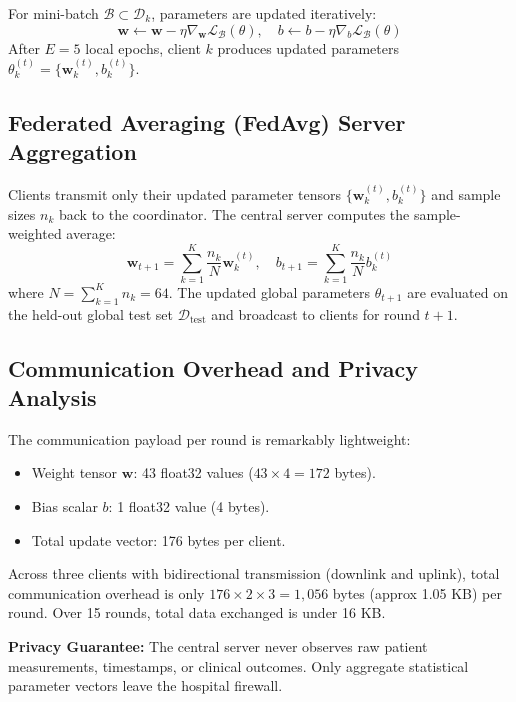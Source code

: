 For mini-batch $\mathcal{B} \subset \mathcal{D}_k$, parameters are updated iteratively:
\begin{equation}
\mathbf{w} \leftarrow \mathbf{w} - \eta \nabla_{\mathbf{w}} \mathcal{L}_{\mathcal{B}}(\theta), \quad b \leftarrow b - \eta \nabla_{b} \mathcal{L}_{\mathcal{B}}(\theta)
\end{equation}
After $E = 5$ local epochs, client $k$ produces updated parameters $\theta_k^{(t)} = \{\mathbf{w}_k^{(t)}, b_k^{(t)}\}$.

\subsection{Federated Averaging (FedAvg) Server Aggregation}
\label{subsec:server_aggregation}

Clients transmit only their updated parameter tensors $\{\mathbf{w}_k^{(t)}, b_k^{(t)}\}$ and sample sizes $n_k$ back to the coordinator. The central server computes the sample-weighted average:
\begin{equation}
\label{eq:fedavg_weights}
\mathbf{w}_{t+1} = \sum_{k=1}^K \frac{n_k}{N} \mathbf{w}_k^{(t)}, \quad b_{t+1} = \sum_{k=1}^K \frac{n_k}{N} b_k^{(t)}
\end{equation}
where $N = \sum_{k=1}^K n_k = 64$. The updated global parameters $\theta_{t+1}$ are evaluated on the held-out global test set $\mathcal{D}_{\text{test}}$ and broadcast to clients for round $t+1$.

\subsection{Communication Overhead and Privacy Analysis}
\label{subsec:comm_privacy}

The communication payload per round is remarkably lightweight:
\begin{itemize}
    \item Weight tensor $\mathbf{w}$: 43 float32 values ($43 \times 4 = 172$ bytes).
    \item Bias scalar $b$: 1 float32 value (4 bytes).
    \item Total update vector: 176 bytes per client.
\end{itemize}
Across three clients with bidirectional transmission (downlink and uplink), total communication overhead is only $176 \times 2 \times 3 = 1,056$ bytes (approx 1.05 KB) per round. Over 15 rounds, total data exchanged is under 16 KB. 

\textbf{Privacy Guarantee:} The central server never observes raw patient measurements, timestamps, or clinical outcomes. Only aggregate statistical parameter vectors leave the hospital firewall.

